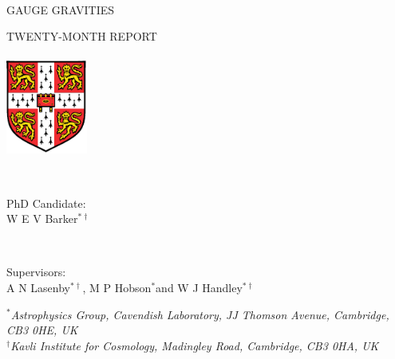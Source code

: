\begin{titlepage}
    \begin{center}
        \vspace*{1cm}
	\HRule\\[0.5cm]
        \Huge
	\textsf{\uppercase{Gauge gravities}}

        \vspace{0.5cm}
        \LARGE
	\textsf{\uppercase{Twenty-Month Report}}\\
	\HRule\\[0.5cm]
	\vfill
	\includegraphics[width=0.2\textwidth]{university_crest.pdf}
	\vfill
\normalsize
	
	\HRule\\[1.5cm]
	
	
	\begin{minipage}[t][1cm][t]{0.49\textwidth}
		\begin{flushleft}
			\Large
			\textsf{PhD Candidate:}\\ \vspace{0.5cm}
		\normalsize	
		W E V Barker$^{*\dagger}$\footnotemark[1]		
	      \end{flushleft}
	\end{minipage}
	~
	\begin{minipage}[t][1cm][t]{0.49\textwidth}
		\begin{flushright}
			\Large
			\textsf{Supervisors:}\\ \vspace{0.5cm}
		\normalsize
		A N Lasenby$^{*\dagger}$\footnotemark[2], M P Hobson$^*$\footnotemark[3] and W J Handley$^{*\dagger}$\footnotemark[4]
		\end{flushright}
	\end{minipage}
\flushleft
{}
\vspace{1cm}
	$^*$\textit{Astrophysics Group, Cavendish Laboratory, JJ Thomson Avenue, Cambridge, CB3 0HE, UK}\\
	$^\dagger$\textit{Kavli Institute for Cosmology, Madingley Road, Cambridge, CB3 0HA, UK}
    \end{center}
\end{titlepage}

